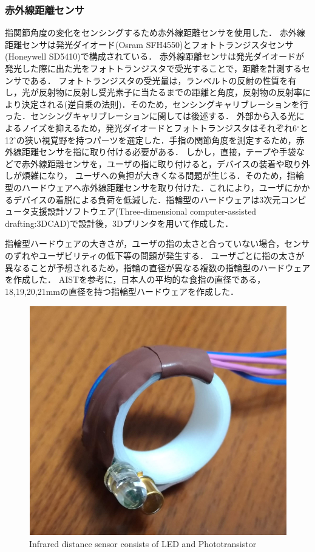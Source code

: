 \subsubsection*{赤外線距離センサ}
指関節角度の変化をセンシングするため赤外線距離センサを使用した．
赤外線距離センサは発光ダイオード(Osram SFH4550)とフォトトランジスタセンサ(Honeywell SD5410)で構成されている．
赤外線距離センサは発光ダイオードが発光した際に出た光をフォトトランジスタで受光することで，距離を計測するセンサである．
フォトトランジスタの受光量は，ランベルトの反射の性質を有し，光が反射物に反射し受光素子に当たるまでの距離と角度，反射物の反射率により決定される(逆自乗の法則)．そのため，センシングキャリブレーションを行った．センシングキャリブレーションに関しては後述する．
外部から入る光によるノイズを抑えるため，発光ダイオードとフォトトランジスタはそれぞれ6$^\circ$と12$^\circ$の狭い視覚野を持つパーツを選定した．手指の関節角度を測定するため，赤外線距離センサを指に取り付ける必要がある．
しかし，直接，テープや手袋などで赤外線距離センサを，ユーザの指に取り付けると，デバイスの装着や取り外しが煩雑になり，
ユーザへの負担が大きくなる問題が生じる．そのため，指輪型のハードウェアへ赤外線距離センサを取り付けた．これにより，ユーザにかかるデバイスの着脱による負荷を低減した．指輪型のハードウェアは3次元コンピュータ支援設計ソフトウェア(Three-dimensional computer-assisted drafting:3DCAD)で設計後，3Dプリンタを用いて作成した．

指輪型ハードウェアの大きさが，ユーザの指の太さと合っていない場合，センサのずれやユーザビリティの低下等の問題が発生する．
ユーザごとに指の太さが異なることが予想されるため，指輪の直径が異なる複数の指輪型のハードウェアを作成した．
AIST\cite{}を参考に，日本人の平均的な食指の直径である，18,19,20,21mmの直径を持つ指輪型ハードウェアを作成した．

\begin{figure}[H]
  \centering
  \includegraphics[width=0.8\linewidth]{fig/fal7}
  \caption{Infrared distance sensor consists of LED and Phototransistor}
  \label{fig:distance sensor}
\end{figure}


